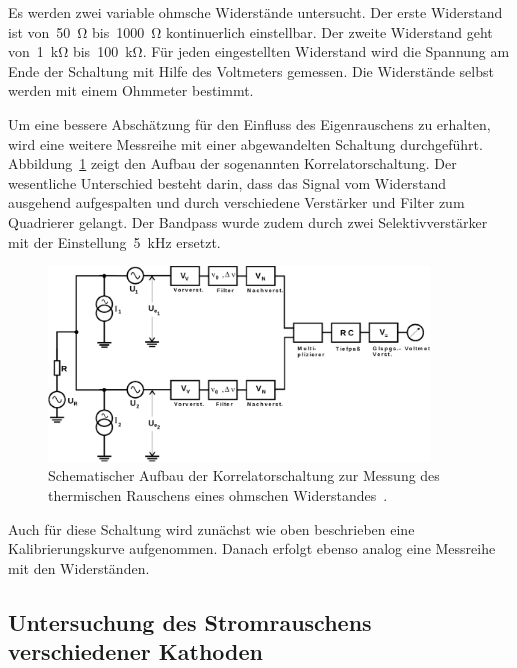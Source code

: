 Es werden zwei variable ohmsche Widerstände untersucht. Der erste Widerstand ist
von~\SI{50}{\ohm} bis~\SI{1000}{\ohm} kontinuerlich einstellbar. Der zweite
Widerstand geht von~\SI{1}{\kilo\ohm} bis~\SI{100}{\kilo\ohm}. Für jeden
eingestellten Widerstand wird die Spannung am Ende der Schaltung mit Hilfe des
Voltmeters gemessen. Die Widerstände selbst werden mit einem Ohmmeter bestimmt.

Um eine bessere Abschätzung für den Einfluss des Eigenrauschens zu erhalten,
wird eine weitere Messreihe mit einer abgewandelten Schaltung durchgeführt.
Abbildung~\ref{fig:aufbau_korrelatorschaltung} zeigt den Aufbau der sogenannten
Korrelatorschaltung. Der wesentliche Unterschied besteht darin, dass das Signal
vom Widerstand ausgehend aufgespalten und durch verschiedene Verstärker und
Filter zum Quadrierer gelangt. Der Bandpass wurde zudem durch zwei
Selektivverstärker mit der Einstellung~\SI{5}{\kilo\hertz} ersetzt.

\begin{figure}
  \centering
  \includegraphics[width=0.9\textwidth]{figures/aufbau_korrelatorschaltung.pdf}
  \caption{Schematischer Aufbau der Korrelatorschaltung zur Messung des
  thermischen Rauschens eines ohmschen Widerstandes~\cite{V57}.}
  \label{fig:aufbau_korrelatorschaltung}
\end{figure}

Auch für diese Schaltung wird zunächst wie oben beschrieben eine
Kalibrierungskurve aufgenommen. Danach erfolgt ebenso analog eine Messreihe mit
den Widerständen.

\subsection{Untersuchung des Stromrauschens verschiedener Kathoden}

